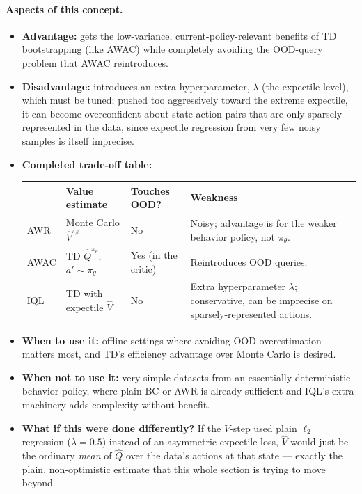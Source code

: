 \documentclass[11pt]{article}
\begin{document}
\paragraph{Aspects of this concept.}
\begin{itemize}
\item \textbf{Advantage:} gets the low-variance, current-policy-relevant benefits of TD
bootstrapping (like AWAC) while completely avoiding the OOD-query problem that AWAC
reintroduces.
\item \textbf{Disadvantage:} introduces an extra hyperparameter, $\lambda$ (the
expectile level), which must be tuned; pushed too aggressively toward the extreme
expectile, it can become overconfident about state-action pairs that are only sparsely
represented in the data, since expectile regression from very few noisy samples is
itself imprecise.
\item \textbf{Completed trade-off table:}
\begin{center}
\begin{tabular}{@{}p{2cm}p{3.6cm}p{2.3cm}p{6.1cm}@{}}
\toprule
& Value estimate & Touches OOD? & Weakness \\
\midrule
AWR & Monte Carlo $\hat V^{\pi_\beta}$ & No & Noisy; advantage is for the weaker behavior
policy, not $\pi_\theta$. \\
AWAC & TD $\hat Q^{\pi_\theta}$, $a'\sim\pi_\theta$ & Yes (in the critic) & Reintroduces
OOD queries. \\
IQL & TD with expectile $\hat V$ & No & Extra hyperparameter $\lambda$; conservative,
can be imprecise on sparsely-represented actions. \\
\bottomrule
\end{tabular}
\end{center}
\item \textbf{When to use it:} offline settings where avoiding OOD overestimation
matters most, and TD's efficiency advantage over Monte Carlo is desired.
\item \textbf{When not to use it:} very simple datasets from an essentially
deterministic behavior policy, where plain BC or AWR is already sufficient and IQL's
extra machinery adds complexity without benefit.
\item \textbf{What if this were done differently?} If the $V$-step used plain
$\ell_2$ regression ($\lambda=0.5$) instead of an asymmetric expectile loss, $\hat V$
would just be the ordinary \emph{mean} of $\hat Q$ over the data's actions at that state
--- exactly the plain, non-optimistic estimate that this whole section is trying to move
beyond.
\end{itemize}
\end{document}
